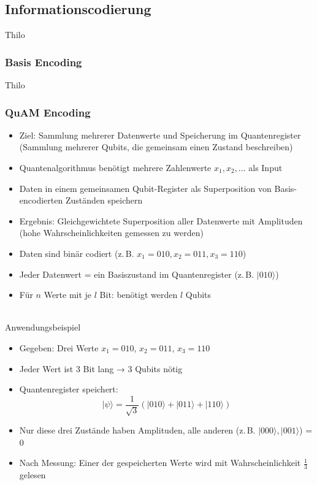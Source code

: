 \subsection{Informationscodierung}
Thilo
\subsubsection{Basis Encoding}
Thilo

\subsubsection{QuAM Encoding}
\begin{itemize}
\item Ziel: Sammlung mehrerer Datenwerte und Speicherung im Quantenregister (Sammlung mehrerer Qubits, die gemeinsam einen Zustand beschreiben)
\item Quantenalgorithmus benötigt mehrere Zahlenwerte \( x_1, x_2, \ldots \) als Input
\item Daten in einem gemeinsamen Qubit-Register als Superposition von Basis-encodierten Zuständen speichern
\item Ergebnis: Gleichgewichtete Superposition aller Datenwerte mit Amplituden (hohe Wahrscheinlichkeiten gemessen zu werden)
\item Daten sind binär codiert (z.\,B. \( x_1 = 010, x_2 = 011, x_3 = 110 \))
\item Jeder Datenwert = ein Basiszustand im Quantenregister (z.\,B. \( |010\rangle \))
\item Für \( n \) Werte mit je \( l \) Bit: benötigt werden \( l \) Qubits
\end{itemize}
\cite{Date encoding patterns for quantum computing}
\\


Anwendungsbeispiel
\begin{itemize}
\item Gegeben: Drei Werte \( x_1 = 010 \), \( x_2 = 011 \), \( x_3 = 110 \)
\item Jeder Wert ist 3 Bit lang → 3 Qubits nötig
\item Quantenregister speichert:
  \[
  |\psi\rangle = \frac{1}{\sqrt{3}} (|010\rangle + |011\rangle + |110\rangle)
  \]
\item Nur diese drei Zustände haben Amplituden, alle anderen (z.\,B. \( |000\rangle, |001\rangle \)) = 0
\item Nach Messung: Einer der gespeicherten Werte wird mit Wahrscheinlichkeit \( \frac{1}{3} \) gelesen
\end{itemize}

